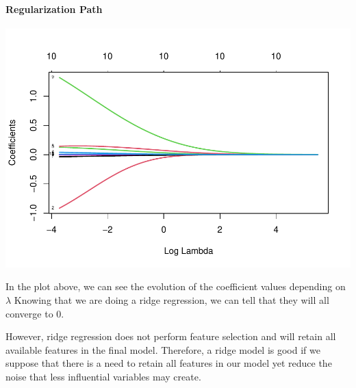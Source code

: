 \documentclass[
]{article}
\newenvironment{Shaded}{\begin{snugshade}}{\end{snugshade}}
\newcommand{\AttributeTok}[1]{\textcolor[rgb]{0.77,0.63,0.00}{#1}}
\newcommand{\ConstantTok}[1]{\textcolor[rgb]{0.00,0.00,0.00}{#1}}
\newcommand{\DecValTok}[1]{\textcolor[rgb]{0.00,0.00,0.81}{#1}}
\newcommand{\FunctionTok}[1]{\textcolor[rgb]{0.00,0.00,0.00}{#1}}
\newcommand{\NormalTok}[1]{#1}
\newcommand{\OtherTok}[1]{\textcolor[rgb]{0.56,0.35,0.01}{#1}}
\newcommand{\SpecialCharTok}[1]{\textcolor[rgb]{0.00,0.00,0.00}{#1}}
\newcommand{\StringTok}[1]{\textcolor[rgb]{0.31,0.60,0.02}{#1}}
\begin{document}
\hypertarget{regularization-path}{%
\paragraph{Regularization Path}\label{regularization-path}}

\begin{Shaded}
\end{Shaded}

\begin{center}\includegraphics{TP3_MERR_HABBOU_KHIDOUR_files/figure-latex/unnamed-chunk-31-1} \end{center}

In the plot above, we can see the evolution of the coefficient values
depending on \(\lambda\) Knowing that we are doing a ridge regression,
we can tell that they will all converge to 0.

However, ridge regression does not perform feature selection and will
retain all available features in the final model. Therefore, a ridge
model is good if we suppose that there is a need to retain all features
in our model yet reduce the noise that less influential variables may
create.
\end{document}
